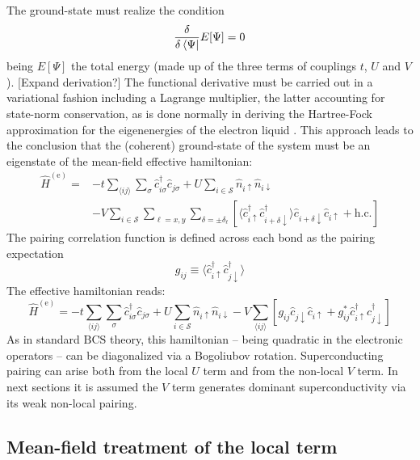 The ground-state must realize the condition
\[
	\fdv{}{\bra{\Psi}} E[\Psi] = 0
\]
being $E[\Psi]$ the total energy (made up of the three terms of couplings $t$, $U$ and $V$). {\color{tabred}[Expand derivation?]} The functional derivative must be carried out in a variational fashion including a Lagrange multiplier, the latter accounting for state-norm conservation, as is done normally in deriving the Hartree-Fock approximation for the eigenenergies of the electron liquid \cite{grosso2014solid, giuliani2005quantum}. This approach leads to the conclusion that the (coherent) ground-state of the system must be an eigenstate of the mean-field effective hamiltonian:
\begin{equation}\label{eq:extended-hubbard-model-effective-intermediate}
	\begin{aligned}
		\hat H^{(\mathrm{e})} =
		&-t \sum_{\langle ij \rangle} \sum_\sigma \hat c_{i\sigma}^\dagger \hat c_{j\sigma}
		+ U \sum_{i \in \mathcal{S}} \hat n_{i\uparrow} \hat n_{i\downarrow} \\
		&- V \sum_{i \in \mathcal{S}} \sum_{\ell = x,y} \sum_{\delta = \pm \delta_\ell} \left[
			\langle 
				\hat c_{i\uparrow}^\dagger \hat c_{i + \delta \downarrow}^\dagger
			\rangle
			\hat c_{i + \delta \downarrow} \hat c_{i\uparrow} 
			+ \mathrm{h}.\mathrm{c}.
		\right]
	\end{aligned}
\end{equation}
The pairing correlation function is defined across each bond as the pairing expectation
\[
	g_{ij} \equiv \langle 
		\hat c_{i\uparrow}^\dagger \hat c_{j\downarrow}^\dagger
	\rangle
\]
The effective hamiltonian reads:
\begin{equation}\label{eq:extended-hubbard-model-effective-intermediate-2}
	\hat H^{(\mathrm{e})} =
	-t \sum_{\langle ij \rangle} \sum_\sigma \hat c_{i\sigma}^\dagger \hat c_{j\sigma}
	+ U \sum_{i \in \mathcal{S}} \hat n_{i\uparrow} \hat n_{i\downarrow}
	- V \sum_{\langle ij \rangle} \left[
		g_{ij} \hat c_{j\downarrow} \hat c_{i\uparrow} + g_{ij}^* \hat c_{i\uparrow}^\dagger \hat c_{j\downarrow}^\dagger
	\right]
\end{equation}
As in standard $\mathrm{BCS}$ theory, this hamiltonian -- being quadratic in the electronic operators -- can be diagonalized via a Bogoliubov rotation. Superconducting pairing can arise both from the local $U$ term and from the non-local $V$ term. In next sections it is assumed the $V$ term generates dominant superconductivity via its weak non-local pairing.

\subsection{Mean-field treatment of the local term}

